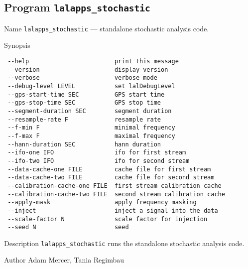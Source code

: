 \subsection{Program \texttt{lalapps\_stochastic}}
\label{program:lalapps-stochastic}

\begin{entry}
\item[Name]
\verb$lalapps_stochastic$ --- standalone stochastic analysis code.

\item[Synopsis]
\begin{verbatim}
 --help                        print this message
 --version                     display version
 --verbose                     verbose mode
 --debug-level LEVEL           set lalDebugLevel
 --gps-start-time SEC          GPS start time
 --gps-stop-time SEC           GPS stop time
 --segment-duration SEC        segment duration
 --resample-rate F             resample rate
 --f-min F                     minimal frequency
 --f-max F                     maximal frequency
 --hann-duration SEC           hann duration
 --ifo-one IFO                 ifo for first stream
 --ifo-two IFO                 ifo for second stream
 --data-cache-one FILE         cache file for first stream
 --data-cache-two FILE         cache file for second stream
 --calibration-cache-one FILE  first stream calibration cache
 --calibration-cache-two FILE  second stream calibration cache
 --apply-mask                  apply frequency masking
 --inject                      inject a signal into the data
 --scale-factor N              scale factor for injection
 --seed N                      seed
\end{verbatim}

\item[Description] \verb$lalapps_stochastic$ runs the standalone
stochastic analysis code.

\item[Author] 
Adam Mercer, Tania Regimbau
\end{entry}
